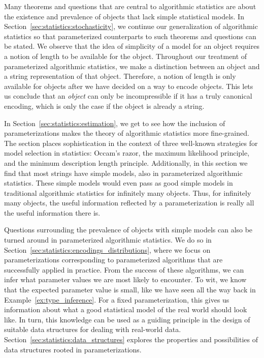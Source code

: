 Many theorems and questions that are central to algorithmic statistics are about the existence and prevalence of objects that lack simple statistical models.
In Section~\ref{sec:statistics:stochasticity}, we continue our generalization of algorithmic statistics so that parameterized counterparts to such theorems and questions can be stated.
We observe that the idea of simplicity of a model for an object requires a notion of length to be available for the object.
Throughout our treatment of parameterized algorithmic statistics, we make a distinction between an object and a string representation of that object.
Therefore, a notion of length is only available for objects after we have decided on a way to encode objects.
This lets us conclude that an \emph{object} can only be incompressible if it has a truly canonical encoding, which is only the case if the object is already a string.

In Section~\ref{sec:statistics:estimation}, we get to see how the inclusion of parameterizations makes the theory of algorithmic statistics more fine-grained.
The section places sophistication in the context of three well-known strategies for model selection in statistics: Occam's razor, the maximum likelihood principle, and the minimum description length principle.
Additionally, in this section we find that most strings have simple models, also in parameterized algorithmic statistics.
These simple models would even pass as good simple models in traditional algorithmic statistics for infinitely many objects.
Thus, for infinitely many objects, the useful information reflected by a parameterization is really all the useful information there is.

Questions surrounding the prevalence of objects with simple models can also be turned around in parameterized algorithmic statistics.
We do so in Section~\ref{sec:statistics:encodings_distributions}, where we focus on parameterizations corresponding to parameterized algorithms that are successfully applied in practice.
From the success of these algorithms, we can infer what parameter values we are most likely to encounter.
To wit, we know that the expected parameter value is small, like we have seen all the way back in Example~\ref{ex:type_inference}.
For a fixed parameterization, this gives us information about what a good statistical model of the real world should look like.
In turn, this knowledge can be used as a guiding principle in the design of suitable data structures for dealing with real-world data.
Section~\ref{sec:statistics:data_structures} explores the properties and possibilities of data structures rooted in parameterizations.


